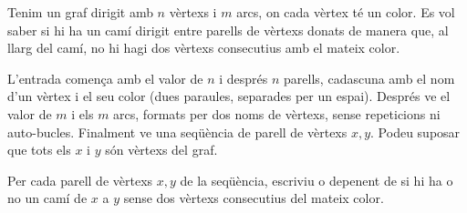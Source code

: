 

\Statement


Tenim un graf dirigit amb $n$ vèrtexs i $m$ arcs, on cada vèrtex té un color. 
Es vol saber si hi ha un camí dirigit entre parells de vèrtexs donats de manera que, 
al llarg del camí, no hi hagi dos vèrtexs consecutius amb el mateix color.


\Input

L'entrada comença amb el valor de $n$ i després $n$ parells, cadascuna
amb el nom d'un vèrtex i el seu color (dues paraules, separades per un
espai). Després ve el valor de $m$ i els $m$ arcs, formats per dos noms
de vèrtexs, sense repeticions ni auto-bucles. Finalment ve una seqüència de
parell de vèrtexs $x, y$. Podeu suposar que tots els $x$ i $y$ són vèrtexs del graf.


\Output


Per cada parell de vèrtexs $x, y$ de la seqüència, escriviu  o 
depenent de si hi ha o no un camí de $x$ a $y$ sense dos vèrtexs consecutius del mateix color.

\Sample

